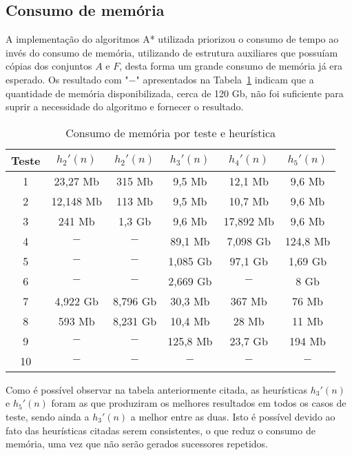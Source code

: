 \documentclass[12pt]{article}
\begin{document}
\subsection{Consumo de memória}

A implementação do algoritmos A* utilizada priorizou o consumo de tempo ao invés do consumo de memória, utilizando de estrutura auxiliares que possuíam cópias dos conjuntos $A$ e $F$, desta forma um grande consumo de memória já era esperado. Os resultado com "$-$" apresentados na Tabela~\ref{tab:tabmem} indicam que a quantidade de memória disponibilizada, cerca de 120 Gb, não foi suficiente para suprir a necessidade do algoritmo e fornecer o resultado.

\begin{table}[H]
\centering
\begin{tabular}{cccccc}
\hline
\textbf{Teste} & $h_{2}'(n)$ & $h_{2}'(n)$ & $h_{3}'(n)$ & $h_{4}'(n)$ & $h_{5}'(n)$ \\ \hline
1 & 23,27 Mb & 315 Mb & 9,5 Mb & 12,1 Mb & 9,6 Mb \\ \hline
2 & 12,148 Mb & 113 Mb & 9,5 Mb & 10,7 Mb & 9,6 Mb \\ \hline
3 & 241 Mb & 1,3 Gb & 9,6 Mb & 17,892 Mb & 9,6 Mb \\ \hline
4 & $-$ & $-$ & 89,1 Mb & 7,098 Gb & 124,8 Mb \\ \hline
5 & $-$ & $-$ & 1,085 Gb & 97,1 Gb & 1,69 Gb \\ \hline
6 & $-$ & $-$ & 2,669 Gb & $-$ & 8 Gb \\ \hline
7 & 4,922 Gb & 8,796 Gb & 30,3 Mb & 367 Mb & 76 Mb \\ \hline
8 & 593 Mb & 8,231 Gb & 10,4 Mb & 28 Mb & 11 Mb \\ \hline
9 & $-$ & $-$ & 125,8 Mb & 23,7 Gb & 194 Mb \\ \hline
10 & $-$ & $-$ & $-$ & $-$ & $-$ \\ \hline
\end{tabular}
\caption{Consumo de memória por teste e heurística}
\label{tab:tabmem}
\end{table}

Como é possível observar na tabela anteriormente citada, as heurísticas $h_{3}'(n)$ e $h_{5}'(n)$ foram as que produziram os melhores resultados em todos os casos de teste, sendo ainda a $h_{3}'(n)$ a melhor entre as duas. Isto é possível devido ao fato das heurísticas citadas serem consistentes, o que reduz o consumo de memória, uma vez que não serão gerados sucessores repetidos.
\end{document}
